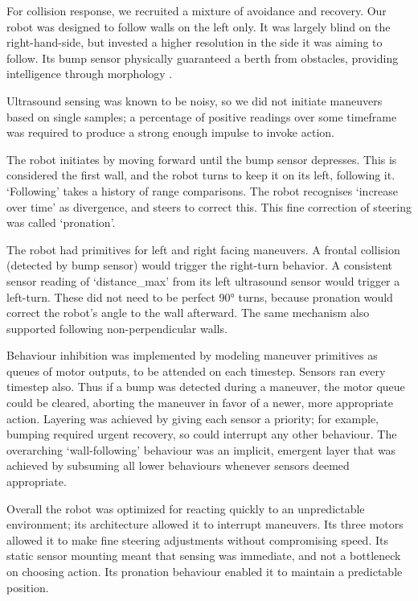 \documentclass[a4paper,12pt]{article}
\begin{document}
For collision response, we recruited a mixture of avoidance and recovery. Our robot was designed to follow walls on the left only. It was largely blind on the right-hand-side, but invested a higher resolution in the side it was aiming to follow. Its bump sensor physically guaranteed a berth from obstacles, providing intelligence through morphology \parencite{pfeifer2005morphological}.

Ultrasound sensing was known to be noisy, so we did not initiate maneuvers based on single samples; a percentage of positive readings over some timeframe was required to produce a strong enough impulse to invoke action.

The robot initiates by moving forward until the bump sensor depresses. This is considered the first wall, and the robot turns to keep it on its left, following it. `Following' takes a history of range comparisons. The robot recognises `increase over time' as divergence, and steers to correct this. This fine correction of steering was called `pronation'.

The robot had primitives for left and right facing maneuvers. A frontal collision (detected by bump sensor) would trigger the right-turn behavior. A consistent sensor reading of `distance\_max' from its left ultrasound sensor would trigger a left-turn. These did not need to be perfect \ang{90} turns, because pronation would correct the robot's angle to the wall afterward. The same mechanism also supported following non-perpendicular walls.

Behaviour inhibition was implemented by modeling maneuver primitives as queues of motor outputs, to be attended on each timestep. Sensors ran every timestep also. Thus if a bump was detected during a maneuver, the motor queue could be cleared, aborting the maneuver in favor of a newer, more appropriate action. Layering was achieved by giving each sensor a priority; for example, bumping required urgent recovery, so could interrupt any other behaviour. The overarching `wall-following' behaviour was an implicit, emergent layer that was achieved by subsuming all lower behaviours whenever sensors deemed appropriate.

Overall the robot was optimized for reacting quickly to an unpredictable environment; its architecture allowed it to interrupt maneuvers. Its three motors allowed it to make fine steering adjustments without compromising speed. Its static sensor mounting meant that sensing was immediate, and not a bottleneck on choosing action. Its pronation behaviour enabled it to maintain a predictable position.
\end{document}
